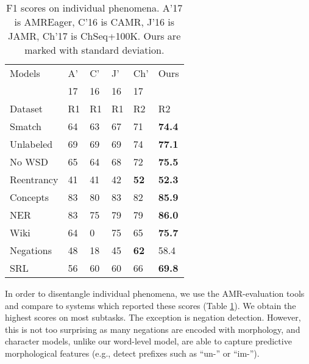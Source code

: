 \documentclass[11pt,a4paper]{article}
\begin{document}
\begin{table}[t] 
    \begin{center} 
        \begin{tabular}{llll|ll} 
            \hline  Models &  A' &  C'  &   J'  &    Ch'   & Ours\\  
             &17  &16   &16  &17   & \\ \hline
            Dataset &  R1 &R1   &R1   &R2   &R2 \\ \hline
             Smatch &  64 & 63  & 67 & {71} & {\bf74.4}\\
             \hline
            Unlabeled & 69  & 69&69 &{ 74} &  {\bf77.1}\\
            No WSD &    65  &64 & 68 & { 72 }&  {\bf75.5}\\
            Reentrancy & 41   & 41  &42 & \bf 52 & {\bf52.3}\\
            Concepts &    83  &80 &83& 82& {\bf 85.9}\\
            NER &  83  & 75  & 79 &79& \bf{86.0}\\
            Wiki &   64 &  0  &{75}& 65 &   {\bf75.7}\\
            Negations&    48  &18 &45 & \bf{62}& {58.4}\\
            SRL&     56  & 60 & 60 &66& {\bf 69.8}\\
            \hline
        \end{tabular}
    \end{center}
    \vspace{-1ex}
	\caption{\label{table:evaluation} F1 scores on individual phenomena. A'17 is AMREager, C'16 is CAMR, J'16 is JAMR, Ch'17 is ChSeq+100K. Ours are marked with standard deviation.
    }
    \vspace{-1ex}
\end{table}

In order to disentangle individual phenomena, we use the AMR-evaluation tools~\cite{Marco} and compare to systems which reported these scores (Table \ref{table:evaluation}). We obtain the highest scores on most subtasks. 
The exception is negation detection. However, this is not too surprising as many negations are encoded with morphology, and character models, unlike our word-level model, are able to capture predictive morphological features (e.g., detect prefixes such as ``un-'' or ``im-''). 
\end{document}

